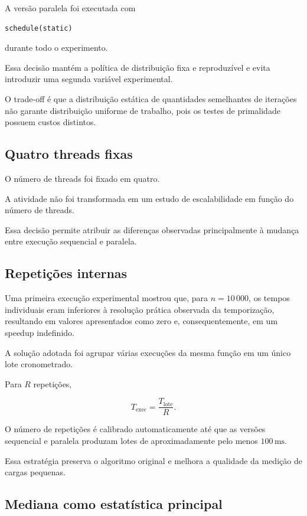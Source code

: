 A versão paralela foi executada com

\begin{verbatim}
schedule(static)
\end{verbatim}

durante todo o experimento.

Essa decisão mantém a política de distribuição fixa e reproduzível e evita
introduzir uma segunda variável experimental.

O trade-off é que a distribuição estática de quantidades semelhantes de
iterações não garante distribuição uniforme de trabalho, pois os testes de
primalidade possuem custos distintos.


\subsection{Quatro threads fixas}

O número de threads foi fixado em quatro.

A atividade não foi transformada em um estudo de escalabilidade em função
do número de threads.

Essa decisão permite atribuir as diferenças observadas principalmente à
mudança entre execução sequencial e paralela.


\subsection{Repetições internas}

Uma primeira execução experimental mostrou que, para \(n=10\,000\), os
tempos individuais eram inferiores à resolução prática observada da
temporização, resultando em valores apresentados como zero e,
consequentemente, em um speedup indefinido.

A solução adotada foi agrupar várias execuções da mesma função em um único
lote cronometrado.

Para \(R\) repetições,

\[
T_{\mathrm{exec}}
=
\frac{T_{\mathrm{lote}}}{R}.
\]

O número de repetições é calibrado automaticamente até que as versões
sequencial e paralela produzam lotes de aproximadamente pelo menos
\(100\,\mathrm{ms}\).

Essa estratégia preserva o algoritmo original e melhora a qualidade da
medição de cargas pequenas.


\subsection{Mediana como estatística principal}

